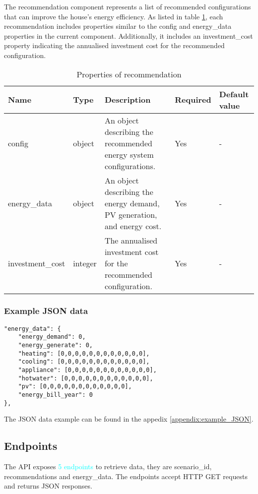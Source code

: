 The recommendation component represents a list of recommended configurations that can improve the house's energy efficiency. 
As listed in table \ref{tab:properties_recommendation}, each recommendation includes properties similar to the config and energy\_data properties in the current component. 
Additionally, it includes an investment\_cost property indicating the annualised investment cost for the recommended configuration. 

\begin{table}[h!]
    \centering
    \small
    \begin{tabular}{ | p{} | p{} | p{} | p{} | p{} | } 
    \hline
    Name & Type & Description & Required & Default value \\
    \hline
    config & object & An object describing the recommended energy system configurations. & Yes & - \\
    \hline
    energy\_data & object & An object describing the energy demand, PV generation, and energy cost. & Yes & - \\
    \hline
    investment\_cost & integer & The annualised investment cost for the recommended configuration. & Yes & - \\
    \hline
    \end{tabular}
    \caption{Properties of recommendation}
    \label{tab:properties_recommendation}
\end{table}


\subsubsection{Example JSON data}

\begin{verbatim}
"energy_data": {
    "energy_demand": 0,
    "energy_generate": 0,
    "heating": [0,0,0,0,0,0,0,0,0,0,0,0],
    "cooling": [0,0,0,0,0,0,0,0,0,0,0,0],
    "appliance": [0,0,0,0,0,0,0,0,0,0,0,0],
    "hotwater": [0,0,0,0,0,0,0,0,0,0,0,0],
    "pv": [0,0,0,0,0,0,0,0,0,0,0,0],
    "energy_bill_year": 0
},
\end{verbatim}

The JSON data example can be found in the appedix \ref{appendix:example_JSON}. 

\subsection{Endpoints}

The API exposes \textcolor{cyan}{5 endpoints} to retrieve data,
they are scenario\_id, recommendations and energy\_data.
The endpoints accept HTTP GET requests and returns JSON responses. 